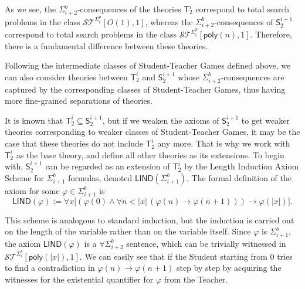 \documentclass[11pt]{article}
\newcommand{\poly}{\mathsf{poly}}
\theoremstyle{definition}
\theoremstyle{definition}
\theoremstyle{remark}
\begin{document}
As we see, the $\Sigma^b_{i+2}$-consequences of the theories $\mathsf{T}^i_2$ correspond to total search problems in the class $\mathcal{ST}^{\Sigma^p_i}[O(1),1]$, whereas the $\Sigma^b_{i+2}$-consequences of $\mathsf{S}^{i+1}_2$ correspond to total search problems in the class $\mathcal{ST}^{\Sigma^p_i}[\mathsf{poly}(n),1]$. Therefore, there is a fundamental difference between these theories.

Following the intermediate classes of Student-Teacher Games defined above, we can also consider theories between $\mathsf{T}^i_2$ and $\mathsf{S}^{i+1}_2$ whose $\Sigma^b_{i+2}$-consequences are captured by the corresponding classes of Student-Teacher Games, thus having more fine-grained separations of theories.

It is known that $\mathsf{T}^{i}_2\subseteq \mathsf{S}^{i+1}_2$, but if we weaken the axioms of $\mathsf{S}^{i+1}_2$ to get weaker theories corresponding to weaker classes of Student-Teacher Games, it may be the case that these theories do not include $\mathsf{T}^{i}_2$ any more. That is why we work with $\mathsf{T}^{i}_2$ as the base theory, and define all other theories as its extensions. To begin with, $\mathsf{S}^{i+1}_2$ can be regarded as an extension of $\mathsf{T}^{i}_2$ by the Length Induction Axiom Scheme for $\Sigma^b_{i+1}$ formulas, denoted $\mathsf{LIND}(\Sigma^b_{i+1})$. 
The formal definition of the axiom for some $\varphi\in \Sigma^b_{i+1}$ is 
\[
\mathsf{LIND}(\varphi) := 
\forall x \Big[(\varphi(0) \land \forall n < |x| \, (\varphi(n)\rightarrow \varphi(n+1))) \rightarrow \varphi(|x|)\Big].
\]

This scheme is analogous to standard induction, but the induction is carried out on the length of the variable rather than on the variable itself. 
Since $\varphi$ is $\Sigma^b_{i+1}$, the axiom $\mathsf{LIND}(\varphi)$ is a $\forall\Sigma^b_{i+2}$ sentence, which can be trivially witnessed in $\mathcal{ST}^{\Sigma^b_i}[\poly(|x|),1]$. We can easily see that if the Student starting from $0$ tries to find a contradiction in $\varphi(n)\to \varphi(n+1)$ step by step by acquiring the witnesses for the existential quantifier for $\varphi$ from the Teacher.
\end{document}
